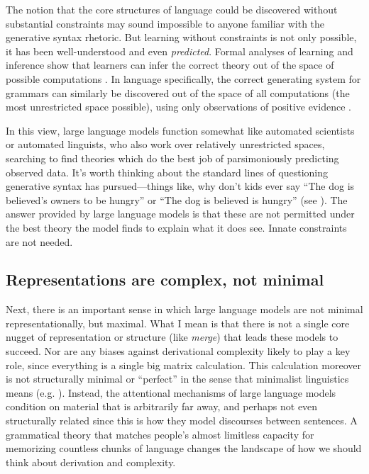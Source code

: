 \documentclass[output=paper,colorlinks,citecolor=brown
]{langscibook}
\begin{document}
The notion that the core structures of language could be discovered without substantial constraints may sound impossible to anyone familiar with the generative syntax rhetoric. But learning without constraints is not only possible, it has been well-understood and even \emph{predicted}. Formal analyses of learning and inference show that learners can infer the correct theory out of the space of possible computations \citep{solomonoff1964formal,hutter2004universal,legg2007universal}. In language specifically, the correct generating system for grammars can similarly be discovered out of the space of all computations (the most unrestricted space possible), using only observations of positive evidence \citep{chater2007ideal}.

In this view, large language models function somewhat like automated scientists or automated linguists, who also work over relatively unrestricted spaces, searching to find theories which do the best job of parsimoniously predicting observed data. It's worth thinking about the standard lines of questioning generative syntax has pursued---things like, why don't kids ever say ``The dog is believed's owners to be hungry'' or ``The dog is believed is hungry'' (see \cite{lasnik2016argument}). The answer provided by large language models is that these are not permitted under the best theory the model finds to explain what it does see. Innate constraints are not needed.


\subsection*{Representations are complex, not minimal}

Next, there is an important sense in which large language models are not minimal representationally, but maximal. What I mean is that there is not a single core nugget of representation or structure (like \emph{merge}) that leads these models to succeed. Nor are any biases against derivational complexity likely to play a key role, since everything is a single big matrix calculation. This calculation moreover is not structurally minimal or ``perfect'' in the sense that minimalist linguistics means (e.g. \cite{lasnik2002minimalist}). Instead, the attentional mechanisms of large language models condition on material that is arbitrarily far away, and perhaps not even structurally related since this is how they model discourses between sentences. A grammatical theory that matches people's almost limitless capacity for memorizing countless chunks of language changes the landscape of how we should think about derivation and complexity. 
\end{document}

